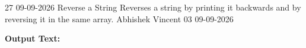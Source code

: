 \clearpage
\label{prog:27}
\programhead
  {27}
  {09-09-2026}
  {Reverse a String}
  {Reverses a string by printing it backwards and by reversing it in the same array.}
  {Abhishek Vincent}
  {03}
  {09-09-2026}

\divider
\textbf{Output Text:}\par
\vspace{2pt}

